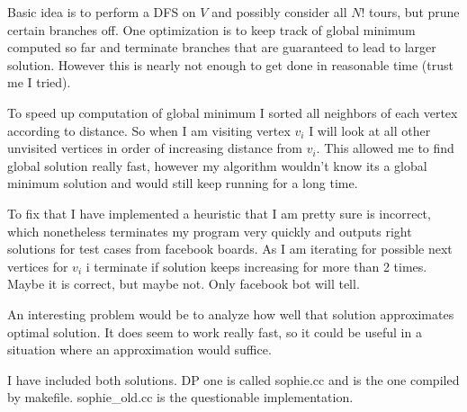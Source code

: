 \documentclass[11pt]{article}
\begin{document}
Basic idea is to perform a DFS on $V$ and possibly consider all $N!$ tours, but prune certain branches off.  One optimization is to keep track of global minimum computed so far and terminate branches that are guaranteed to lead to larger solution.  However this is nearly not enough to get done in reasonable time (trust me I tried).

To speed up computation of global minimum I sorted all neighbors of each vertex according to distance.  So when I am visiting vertex $v_{i}$ I will look at all other unvisited vertices in order of increasing distance from $v_{i}$.  This allowed me to find global solution really fast, however my algorithm wouldn't know its a global minimum solution and would still keep running for a long time.  

To fix that I have implemented a heuristic that I am pretty sure is incorrect, which nonetheless terminates my program very quickly and outputs right solutions for test cases from facebook boards.  As I am iterating for possible next vertices for $v_{i}$ i terminate if solution keeps increasing for more than 2 times.  Maybe it is correct, but maybe not.  Only facebook bot will tell.  

An interesting problem would be to analyze how well that solution approximates optimal solution.  It does seem to work really fast, so it could be useful in a situation where an approximation would suffice.  

I have included both solutions.  DP one is called sophie.cc and is the one compiled by makefile.  sophie\_old.cc is the questionable implementation.



\end{document}
